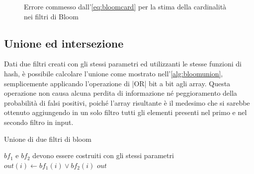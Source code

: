 \begin{figure}
\begin{minipage}[c]{0.7\textwidth}
{		}
	\end{minipage}
	\begin{minipage}[c]{0.7\textwidth}
	\end{minipage}

	\caption{Errore commesso dall'\autoref{eq:bloomcard} per la stima della car\-di\-na\-li\-tà nei
	filtri di Bloom}
	\label{fig:bloomerror}
\end{figure}

\subsection{Unione ed intersezione}

Dati due filtri creati con gli stessi parametri ed utilizzanti le stesse funzioni di hash, è
possibile calcolare l'unione come mostrato nell'\autoref{alg:bloomunion}, semplicemente applicando
l'operazione di \cverb|OR| bit a bit agli array. Questa operazione non causa alcuna perdita di
informazione né peggioramento della probabilità di falsi positivi, poiché l'array risultante è il
medesimo che si sarebbe ottenuto aggiungendo in un solo filtro tutti gli elementi presenti nel primo
e nel secondo filtro in input.

\begin{algorithm}
\caption{Unione di due filtri di bloom}
\label{alg:bloomunion}
\begin{algorithmic}[1]
\Require $bf_1$ e $bf_2$ devono essere costruiti con gli stessi pa\-ra\-me\-tri
		\State $out(i) \gets bf_1(i) \lor bf_2(i)$
	\EndFor
	\State \Return $out$
\EndProcedure
\end{algorithmic}
\end{algorithm}


